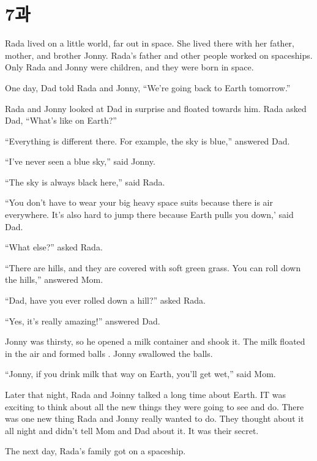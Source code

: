 \documentclass[9pt, a4paper]{oblivoir}
\begin{document}
    \newpage

    \section*{7과}

    Rada lived on a little world, far out in space. She lived there with her father, mother, and brother Jonny. 
    Rada's father and other people worked on spaceships. Only Rada and Jonny were children, and they were born in space. \newline

    One day, Dad told Rada and Jonny, ``We're going back to Earth tomorrow.''

    Rada and Jonny looked at Dad in surprise and floated towards him. Rada asked Dad, ``What's like on Earth?''

    ``Everything is different there. For example, the sky is blue,'' answered Dad.

    ``I've never seen a blue sky,'' said Jonny.

    ``The sky is always black here,'' said Rada.

    ``You don't have to wear your big heavy space suits because there is air everywhere.
    It's also hard to jump there because Earth pulls you down,' said Dad.

    ``What else?'' asked Rada.
    
    ``There are hills, and they are covered with soft green grass.
    You can roll down the hills,'' answered Mom.

    ``Dad, have you ever rolled down a hill?'' asked Rada.
    
    ``Yes, it's really amazing!'' answered Dad.

    Jonny was thirsty, so he opened a milk container and shook it. The milk floated in the air and formed balls . Jonny swallowed the balls. 
    
    ``Jonny, if you drink milk that way on Earth, you'll get wet,'' said Mom. \newline

    Later that night, Rada and Joinny talked a long time about Earth. IT was exciting to think about all the new things they were going to see and do.
    There was one new thing Rada and Jonny really wanted to do.
    They thought about it all night and didn't tell Mom and Dad about it. It was their secret.

    The next day, Rada's family got on a spaceship. 
\end{document}
